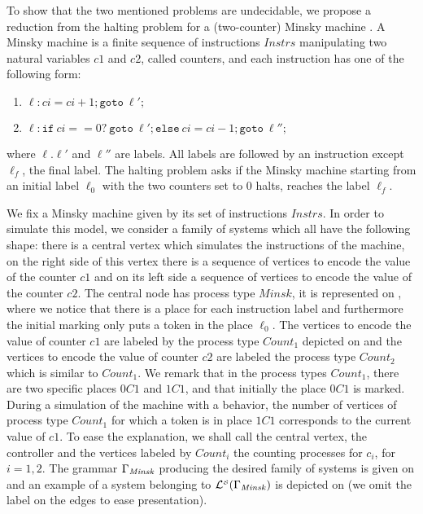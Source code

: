 \newcommand{\Instrs}{\mathit{Instrs}}
\newcommand{\Count}{\mathit{Count}}
\newcommand{\Minsk}{\mathit{Minsk}}

To show that the two mentioned problems are undecidable,
we propose a reduction from the halting problem for a (two-counter) Minsky machine \cite{minsky-computation-67}.
A Minsky machine is a finite sequence of instructions $\Instrs$ manipulating two natural variables $c1$ and $c2$,
called counters, and each instruction has one of the following form:
\begin{enumerate}
\item $\ell:ci=ci+1;\mathtt{goto}~\ell';$
\item $\ell:\mathtt{if}~ci==0?~\mathtt{goto}~ \ell'; \mathtt{else}~ci=ci-1;\mathtt{goto}~\ell'';$
\end{enumerate}
where $\ell$.$\ell'$ and $\ell''$ are labels.
All labels are followed by an instruction except $\ell_f$, the final label.
The halting problem asks if the Minsky machine starting from an initial label $\ell_0$
with the two counters set to $0$ halts, \ie reaches the label $\ell_f$.





We fix a Minsky machine given by its set of instructions $\Instrs$.
In order to simulate this model, we consider a family of systems which all have the following shape:
there is a central vertex which simulates the instructions of the machine,
on the right side of this vertex there is a sequence of vertices to encode the value of the counter $c1$
and on its left side a sequence of vertices to encode the value of the counter $c2$.
The central node has process type $\Minsk$, it is represented on ,
where we notice that there is a place for each instruction label
and furthermore the initial marking only puts a token in the place $\ell_0$.
The vertices to encode the value of counter $c1$ are labeled by the process type $\Count_1$
depicted on  and the vertices to encode the value of counter $c2$
are labeled the process type $\Count_2$ which is similar to $\Count_1$.
We remark that in the process types $\Count_1$, there are two specific places $0C1$ and $1C1$,
and that initially the place $0C1$ is marked.
During a simulation of the machine with a behavior,
the number of vertices of process type $\Count_1$ for which a token is in place $1C1$
corresponds to the current value of $c1$.
To ease the explanation, we shall call the central vertex,
the controller and the vertices labeled by $\Count_i$ the counting processes for $c_i$, for $i=1,2$.
The grammar $\grammar_\Minsk$ producing the desired family of systems is given on
 and an example of a system belonging to
$\alangof{}{\algof{S}}{\grammar_{\Minsk}}$ is depicted on 
(we omit the label on the edges to ease presentation).

